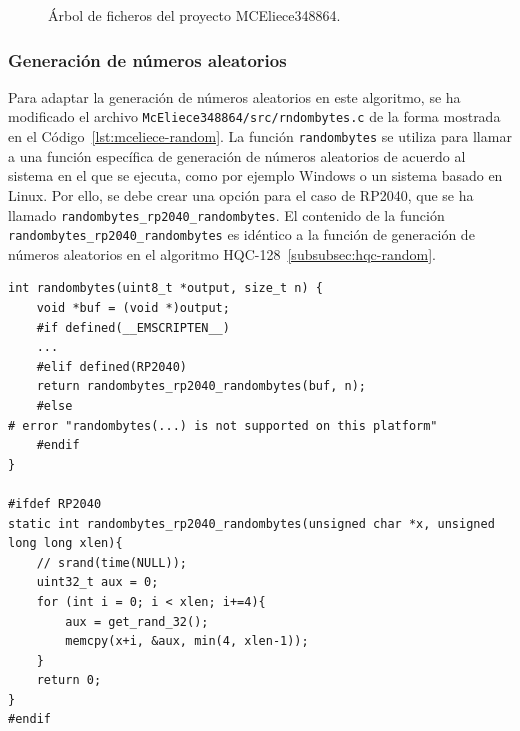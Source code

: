 \begin{figure}[H]
\centering
{}
\caption{Árbol de ficheros del proyecto MCEliece348864.}
\label{tree:mceliece}
\end{figure}


\subsubsection{Generación de números aleatorios}\label{subsubsec:mceliece-random}

Para adaptar la generación de números aleatorios en este algoritmo, se ha modificado el archivo \texttt{McEliece348864/src/rndombytes.c} de la forma mostrada en el Código~\ref{lst:mceliece-random}.
La función \texttt{randombytes} se utiliza para llamar a una función específica de generación de números aleatorios de acuerdo al sistema en el que se ejecuta, como por ejemplo Windows o un sistema basado en Linux.
Por ello, se debe crear una opción para el caso de RP2040, que se ha llamado \texttt{randombytes\_rp2040\_randombytes}.
El contenido de la función \texttt{randombytes\_rp2040\_randombytes} es idéntico a la función de generación de números aleatorios en el algoritmo HQC-128~\ref{subsubsec:hqc-random}.

\begin{lstlisting}[label={lst:mceliece-random},style=Cnice,firstnumber=1,caption={Archivo \texttt{McEliece348864/src/rndombytes.c}.}]
int randombytes(uint8_t *output, size_t n) {
    void *buf = (void *)output;
    #if defined(__EMSCRIPTEN__)
    ...
    #elif defined(RP2040)
    return randombytes_rp2040_randombytes(buf, n);
    #else
# error "randombytes(...) is not supported on this platform"
    #endif
}

#ifdef RP2040
static int randombytes_rp2040_randombytes(unsigned char *x, unsigned long long xlen){
    // srand(time(NULL));
    uint32_t aux = 0;
    for (int i = 0; i < xlen; i+=4){
        aux = get_rand_32();
        memcpy(x+i, &aux, min(4, xlen-1));
    }
    return 0;
}
#endif
\end{lstlisting}



